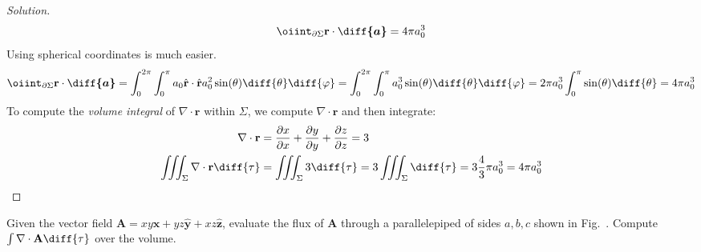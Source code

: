 \documentclass[crop=false,class=article,oneside]{standalone}
\begin{document}
\begin{proof}[Solution]
            \begin{equation*}
                \oiint_{\partial\Sigma}
                \mathbf{r}\cdot\boldsymbol{\diff{a}}
                =4\pi{a_{0}^{3}}
            \end{equation*}
            Using spherical coordinates is much easier.
            \begin{equation*}
                \oiint_{\partial\Sigma}
                \mathbf{r}\cdot\boldsymbol{\diff{a}}
                =\int_{0}^{2\pi}\int_{0}^{\pi}a_{0}
                \hat{\mathbf{r}}\cdot
                \hat{\mathbf{r}}a_{0}^{2}
                \sin(\theta)\diff{\theta}\diff{\varphi}
                =\int_{0}^{2\pi}\int_{0}^{\pi}a_{0}^{3}
                \sin(\theta)\diff{\theta}\diff{\varphi}
                =2\pi a_{0}^{3}\int_{0}^{\pi}
                \sin(\theta)\diff{\theta}=4\pi{a_{0}^{3}}
            \end{equation*}
            To compute the \textit{volume integral} of
            $\nabla\cdot\mathbf{r}$ within $\Sigma$,
            we compute $\nabla\cdot\mathbf{r}$
            and then integrate:
            \begin{align*}
                \nabla\cdot\mathbf{r}
                &=\frac{\partial{x}}{\partial{x}}
                +\frac{\partial{y}}{\partial{y}}
                +\frac{\partial{z}}{\partial{z}}=3\\
                \iiint_{\Sigma}
                \nabla\cdot\mathbf{r}\diff{\tau}
                &=\iiint_{\Sigma}3\diff{\tau}
                 =3\iiint_{\Sigma}\diff{\tau}
                 =3\frac{4}{3}\pi{a_{0}^{3}}
                 =4\pi{a_{0}^{3}}
            \end{align*}
        \end{proof} 
        \begin{problem}[Wangsness 1-13]
            \label{problem:EMAG_1_wangsness_1_13}
            Given the vector field
            $\mathbf{A}=%
             xy\hat{\mathbf{x}}%
             +yz\hat{\mathbf{y}}%
             +xz\hat{\mathbf{z}}$,
            evaluate the flux of $\mathbf{A}$
            through a parallelepiped of sides $a,b,c$
            shown in Fig.~.
            Compute $\int\nabla\cdot\mathbf{A}\diff{\tau}$
            over the volume.
        \end{problem}
\end{document}
